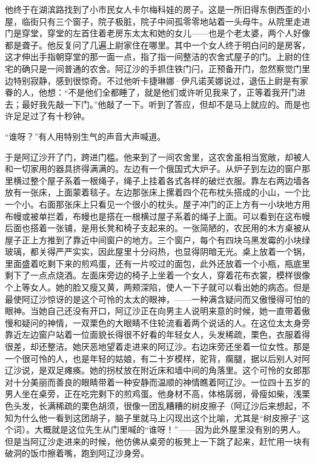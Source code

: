 \par 他终于在湖滨路找到了小市民女人卡尔梅科娃的房子。这是一所旧得东倒西歪的小屋，临街只有三个窗子，院子极脏，院子中间孤零零地站着一头母牛。从院里走进门是穿堂，穿堂的左首住着老房东太太和她的女儿——也是个老太婆，两个人好像都是聋子。他反复问了几遍上尉家住在哪里。其中一个女人终于明白问的是房客，这才伸出手指朝穿堂的那一面一点，指了指一间整洁的农舍式屋子的门。上尉的住宅的确只是一间普通的农舍。阿辽沙的手抓住铁门闩，正预备开门，忽然察觉门里边特别寂静，感到很惊奇。不过他听卡捷琳娜·伊凡诺芙娜说过，退伍上尉是有家眷的人，他想：“不是他们全都睡了，就是他们或许听见我来了，正等着我开门进去；最好我先敲一下门。”他敲了一下。听到了答应，但却不是马上就应的。而是也许足足过了有十秒钟。
\par “谁呀？”有人用特别生气的声音大声喊道。
\par 于是阿辽沙开了门，跨进门槛。他来到了一间农舍里，这农舍虽相当宽敞，却被人和一切家用的器具挤得满满的。左边有一个俄国式大炉子。从炉子到左边的窗户那里横过整个屋子系着一根绳子，绳子上挂着各式各样的破烂衣服。靠左右两边墙各放有一张床，上面蒙着毯子。左边那张床上摞着四个花布枕头搭成的小山，一个比一个小。右面那张床上只看见一个很小的枕头。屋子冲门的正上方有一小块地方用布幔或被单拦着，布幔也是搭在一根横过屋子系着的绳子上面。可以看到在这布幔后面也搭着一张铺，是用长凳和椅子支起来的。一张简陋的，农民用的木方桌被从屋子正上方推到了靠近中间窗户的地方。三个窗户，每个有四块乌黑发霉的小块绿玻璃，都关得严严实实，因此屋里十分闷热，也显得阴暗无光。桌上放着一个锅，里面盛着吃剩下来的煎鸡蛋，还有一片咬过的面包，此外还放着一个小瓶，瓶底里剩下了一点点烧酒。左面床旁边的椅子上坐着一个女人，穿着花布衣裳，模样很像个上等女人。她的脸又瘦又黄，两颊深陷，使人一下子就可以看出她的病态。但是最使阿辽沙惊讶的是这个可怜的太太的眼神，——一种满含疑问而又傲慢得可怕的眼神。当她自己还没有开口，阿辽沙正在向男主人说明来意的时候，她一直带着傲慢和疑问的神情，一双栗色的大眼睛不住轮流看着两个说话的人。在这位太太身旁靠近左边窗户站着一位面貌长得很不好看的年轻女人，头发稀疏，栗色，衣服着得很差，却还整洁。她厌恶地望着走进来的阿辽沙。右边床旁还坐着一位女性。那是一个很可怜的人，也是年轻的姑娘，有二十岁模样，驼背，瘸腿，据以后别人对阿辽沙说，是双足瘫痪。她的拐杖放在附近床和墙中间的角落里。这个可怜的女郎那对十分美丽而善良的眼睛带着一种安静而温顺的神情瞧着阿辽沙。一位四十五岁的男人坐在桌旁，正在吃完剩下的煎鸡蛋。他身材不高，体格孱弱，骨瘦如柴，浅栗色头发，长满稀疏的栗色胡须，很像一团乱糟糟的树皮擦子（阿辽沙后来想起，不知为什么他一看到这团胡子，脑子里就马上闪现出这个比喻，尤其是“树皮擦子”这个词）。大概就是这位先生从门里喊的“谁呀！”——因为此外屋里没有别的男人。但是当阿辽沙走进来的时候，他仿佛从桌旁的板凳上一下跳了起来，赶忙用一块有破洞的饭巾擦着嘴，跑到阿辽沙身旁。
